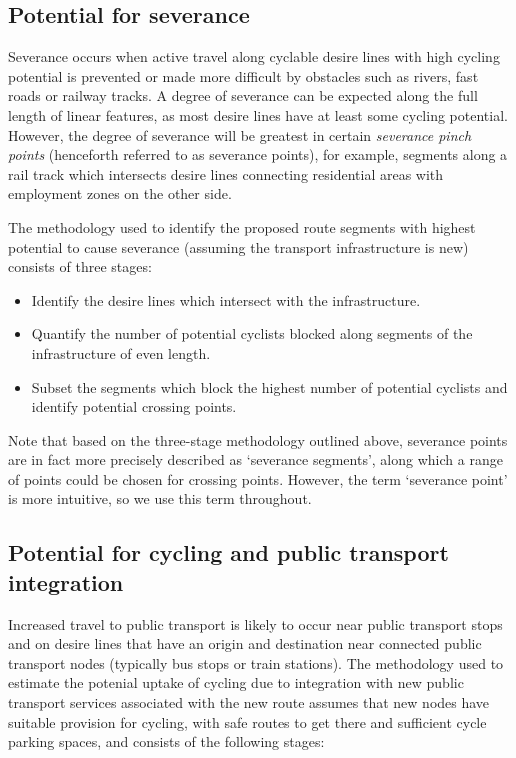 \documentclass[11pt]{article}
\begin{document}
\subsection{Potential for severance}\label{potential-for-severance}

Severance occurs when active travel along cyclable desire lines with
high cycling potential is prevented or made more difficult by obstacles
such as rivers, fast roads or railway tracks. A degree of severance can
be expected along the full length of linear features, as most desire
lines have at least some cycling potential. However, the degree of
severance will be greatest in certain \emph{severance pinch points}
(henceforth referred to as severance points), for example, segments
along a rail track which intersects desire lines connecting residential
areas with employment zones on the other side.

The methodology used to identify the proposed route segments with
highest potential to cause severance (assuming the transport
infrastructure is new) consists of three stages:

\begin{itemize}
\item
  Identify the desire lines which intersect with the infrastructure.
\item
  Quantify the number of potential cyclists blocked along segments of
  the infrastructure of even length.
\item
  Subset the segments which block the highest number of potential
  cyclists and identify potential crossing points.
\end{itemize}

Note that based on the three-stage methodology outlined above, severance
points are in fact more precisely described as `severance segments',
along which a range of points could be chosen for crossing points.
However, the term `severance point' is more intuitive, so we use this
term throughout.

\subsection{Potential for cycling and public transport
integration}\label{potential-for-cycling-and-public-transport-integration}

Increased travel to public transport is likely to occur near public
transport stops and on desire lines that have an origin and destination
near connected public transport nodes (typically bus stops or train
stations). The methodology used to estimate the potenial uptake of
cycling due to integration with new public transport services associated
with the new route assumes that new nodes have suitable provision for
cycling, with safe routes to get there and sufficient cycle parking
spaces, and consists of the following stages:
\end{document}
